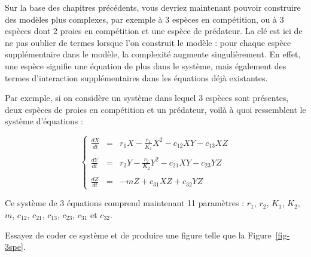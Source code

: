 \documentclass[
  french,
  a4paper,
  DIV=11,
  numbers=noendperiod,
  oneside]{scrreprt}
\begin{document}
\begin{tcolorbox}
Sur la base des chapitres précédents, vous devriez maintenant pouvoir
construire des modèles plus complexes, par exemple à 3 espèces en
compétition, ou à 3 espèces dont 2 proies en compétition et une espèce
de prédateur. La clé est ici de ne pas oublier de termes lorsque l'on
construit le modèle : pour chaque espèce supplémentaire dans le modèle,
la complexité augmente singulièrement. En effet, une espèce signifie une
équation de plus dans le système, mais également des termes
d'interaction supplémentaires dans les équations déjà existantes.

Par exemple, si on considère un système dans lequel 3 espèces sont
présentes, deux espèces de proies en compétition et un prédateur, voilà
à quoi ressemblent le système d'équations :

\[
    \left\{
    \begin{array}{rcl}
        \displaystyle \frac{dX}{dt} & = & r_1X - \frac{r_1}{K_1}X^2 - c_{12}XY - c_{13}XZ \\
        & & \\
        \displaystyle \frac{dY}{dt} & = & r_2Y - \frac{r_2}{K_2}Y^2 - c_{21}XY - c_{23}YZ \\
        & & \\
        \displaystyle \frac{dZ}{dt} & = & -mZ + c_{31}XZ + c_{32}YZ
    \end{array}
    \right.
\]

Ce système de 3 équations comprend maintenant 11 paramètres : \(r_1\),
\(r_2\), \(K_1\), \(K_2\), \(m\), \(c_{12}\), \(c_{21}\), \(c_{13}\),
\(c_{23}\), \(c_{31}\) et \(c_{32}\).

Essayez de coder ce système et de produire une figure telle que la
Figure~\ref{fig-3spe}.

{
\makeatletter
\def\LT@makecaption#1#2#3{%
  \noalign{\smash{\hbox{\kern\textwidth\rlap{\kern\marginparsep
  \parbox[t]{\marginparwidth}{%
    \footnotesize{%
      \vspace{(1.1\baselineskip)}
    #1{#2: }\ignorespaces #3}}}}}}%
    }
\makeatother

\begin{figure}[H]



\end{figure}}
\end{tcolorbox}
\end{document}

